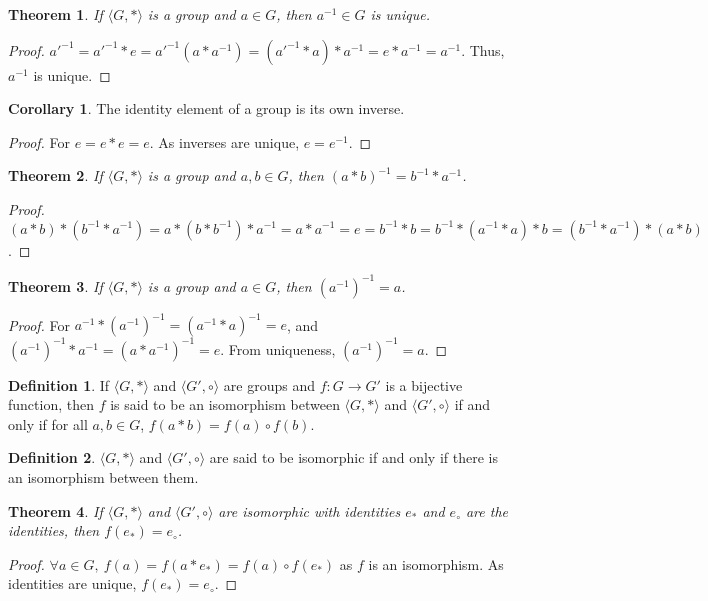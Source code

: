 \documentclass[oneside]{book}
\newtheorem{theorem}{Theorem}[section]
\theoremstyle{definition}
\newtheorem{definition}{Definition}[section]
\newtheorem{corollary}{Corollary}[section]
\begin{document}
\begin{theorem}
If $\langle G, * \rangle$ is a group and $a\in G$, then $a^{-1}\in G$ is unique.
\end{theorem}
\begin{proof}
$a'^{-1} = a'^{-1}*e = a'^{-1}(a*a^{-1}) = (a'^{-1}*a)*a^{-1} = e*a^{-1} = a^{-1}$. Thus, $a^{-1}$ is unique.
\end{proof}

\begin{corollary}
The identity element of a group is its own inverse.
\end{corollary}
\begin{proof}
For $e=e*e = e$. As inverses are unique, $e=e^{-1}$.
\end{proof}

\begin{theorem}
If $\langle G,*\rangle$ is a group and $a,b\in G$, then $(a*b)^{-1} = b^{-1}*a^{-1}$.
\end{theorem}
\begin{proof}
$(a*b)*(b^{-1}*a^{-1}) = a*(b*b^{-1})*a^{-1} = a*a^{-1} = e=b^{-1}*b=b^{-1}*(a^{-1}*a)*b=(b^{-1}*a^{-1})*(a*b)  $.
\end{proof}

\begin{theorem}
If $\langle G,* \rangle$ is a group and $a\in G$, then $(a^{-1})^{-1} = a$.
\end{theorem}
\begin{proof}
For $a^{-1}*(a^{-1})^{-1} = (a^{-1}* a)^{-1} = e$, and $(a^{-1})^{-1}*a^{-1} = (a*a^{-1})^{-1} = e$. From uniqueness, $(a^{-1})^{-1} = a$.
\end{proof}

\begin{definition}
If $\langle G, * \rangle$ and $\langle G',\circ \rangle$ are groups and $f:G\rightarrow G'$ is a bijective function, then $f$ is said to be an isomorphism between $\langle G, * \rangle$ and $\langle G',\circ \rangle$ if and only if for all $a,b\in G$, $f(a*b) =f(a)\circ f(b)$.
\end{definition}

\begin{definition}
$\langle G, *\rangle$ and $\langle G', \circ \rangle$ are said to be isomorphic if and only if there is an isomorphism between them.
\end{definition}

\begin{theorem}
If $\langle G, * \rangle$ and $\langle G', \circ \rangle$ are isomorphic with identities $e_*$ and $e_{\circ}$ are the identities, then $f(e_*) = e_{\circ}$.
\end{theorem}
\begin{proof}
$\forall a\in G,\ f(a)=f(a* e_*) = f(a)\circ f(e_*)$ as $f$ is an isomorphism. As identities are unique, $f(e_*) = e_{\circ}$.
\end{proof}
\end{document}
